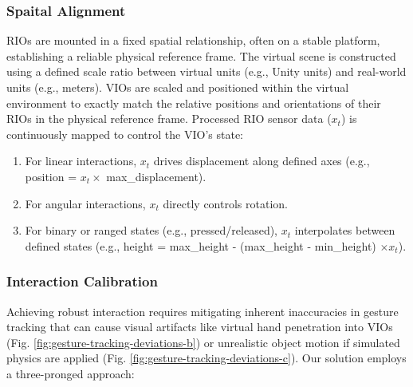 \documentclass[runningheads]{llncs}
\begin{document}
\subsubsection{Spaital Alignment}
RIOs are mounted in a fixed spatial relationship, often on a stable platform, establishing a reliable physical reference frame. The virtual scene is constructed using a defined scale ratio between virtual units (e.g., Unity units) and real-world units (e.g., meters). VIOs are scaled and positioned within the virtual environment to exactly match the relative positions and orientations of their RIOs in the physical reference frame. Processed RIO sensor data ($x_t$) is continuously mapped to control the VIO's state:
\begin{enumerate}
  \item For linear interactions, $x_t$ drives displacement along defined axes (e.g., position = $x_t \times$ max\_displacement).

  \item For angular interactions, $x_t$ directly controls rotation.

  \item For binary or ranged states (e.g., pressed/released), $x_t$ interpolates between defined states (e.g., height = max\_height - (max\_height - min\_height) $\times x_t$).
\end{enumerate}


\subsubsection{Interaction Calibration}
Achieving robust interaction requires mitigating inherent inaccuracies in gesture tracking that can cause visual artifacts like virtual hand penetration into VIOs (Fig. \ref{fig:gesture-tracking-deviations-b}) or unrealistic object motion if simulated physics are applied (Fig. \ref{fig:gesture-tracking-deviations-c}). Our solution employs a three-pronged approach:
\end{document}
